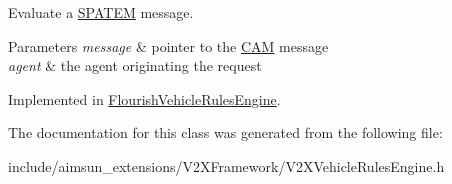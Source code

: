 Evaluate a \hyperlink{structSPATEM}{S\+P\+A\+T\+EM} message. 


\begin{DoxyParams}{Parameters}
{\em message} & pointer to the \hyperlink{structCAM}{C\+AM} message \\
\hline
{\em agent} & the agent originating the request \\
\hline
\end{DoxyParams}


Implemented in \hyperlink{classFlourishVehicleRulesEngine_a02ba3d43bf9f4c46b8f80da684871c8b}{Flourish\+Vehicle\+Rules\+Engine}.



The documentation for this class was generated from the following file\+:\begin{DoxyCompactItemize}
\item 
include/aimsun\+\_\+extensions/\+V2\+X\+Framework/V2\+X\+Vehicle\+Rules\+Engine.\+h\end{DoxyCompactItemize}
